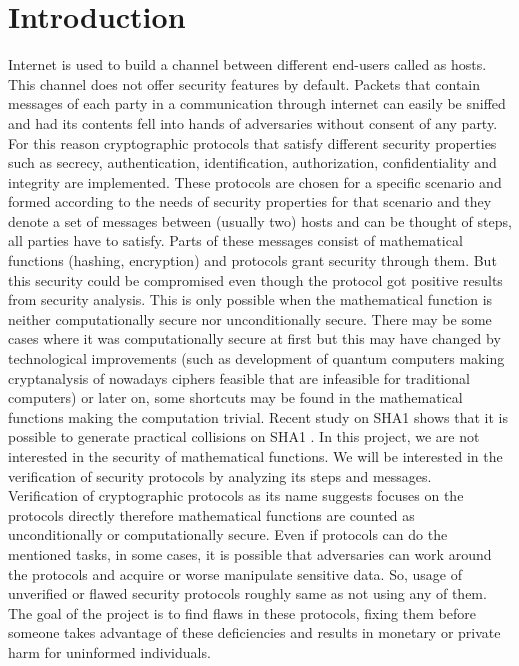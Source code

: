\documentclass[a4paper, 12pt, titlepage]{article}
\begin{document}
\section{Introduction}
Internet is used to build a channel between different end-users called as hosts. This channel does not offer security features by default. Packets that contain messages of each party in a communication through internet can easily be sniffed and had its contents fell into hands of adversaries without consent of any party. For this reason cryptographic protocols that satisfy different security properties such as secrecy, authentication, identification, authorization, confidentiality and integrity are implemented. These protocols are chosen for a specific scenario and formed according to the needs of security properties for that scenario and they denote a set of messages between (usually two) hosts and can be thought of steps, all parties have to satisfy. Parts of these messages consist of mathematical functions (hashing, encryption) and protocols grant security through them. But this security could be compromised even though the protocol got positive results from security analysis. This is only possible when the mathematical function is neither computationally secure nor unconditionally secure. There may be some cases where it was computationally secure at first but this may have changed by technological improvements (such as development of quantum computers making cryptanalysis of nowadays ciphers feasible that are infeasible for traditional computers) or later on, some shortcuts may be found in the mathematical functions making the computation trivial. Recent study on SHA1 shows that it is possible to generate practical collisions on SHA1 \cite{sha1}. In this project, we are not interested in the security of mathematical functions. We will be interested in the verification of security protocols by analyzing its steps and messages. \cite{avispa}
\bigskip
\\ Verification of cryptographic protocols as its name suggests focuses on the protocols directly therefore mathematical functions are counted as unconditionally or computationally secure. Even if protocols can do the mentioned tasks, in some cases, it is possible that adversaries can work around the protocols and acquire or worse manipulate sensitive data. So, usage of unverified or flawed security protocols roughly same as not using any of them. The goal of the project is to find flaws in these protocols, fixing them before someone takes advantage of these deficiencies and results in monetary or private harm for uninformed individuals.
\end{document}
